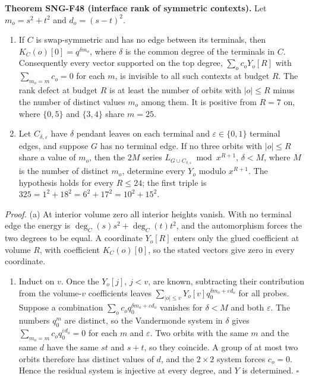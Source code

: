 \documentclass[
  11pt,
  a4paper,
]{report}
\providecommand{\tightlist}{%
  \setlength{\itemsep}{0pt}\setlength{\parskip}{0pt}}
\begin{document}
\textbf{Theorem SNG-F48 (interface rank of symmetric contexts).} Let
\(m_o=s^2+t^2\) and \(d_o=(s-t)^2\).

\begin{enumerate}
\def\labelenumi{(\alph{enumi})}
\item
  If \(C\) is swap-symmetric and has no edge between its terminals, then
  \(K_C(o)[0]=q^{\delta m_o}\), where \(\delta\) is the common degree of
  the terminals in \(C\). Consequently every vector supported on the top
  degree, \(\sum_oc_oY_o[R]\) with \(\sum_{m_o=m}c_o=0\) for each \(m\),
  is invisible to all such contexts at budget \(R\). The rank defect at
  budget \(R\) is at least the number of orbits with \(|o|\le R\) minus
  the number of distinct values \(m_o\) among them. It is positive from
  \(R=7\) on, where \(\{0,5\}\) and \(\{3,4\}\) share \(m=25\).
\item
  Let \(C_{\delta,\varepsilon}\) have \(\delta\) pendant leaves on each
  terminal and \(\varepsilon\in\{0,1\}\) terminal edges, and suppose
  \(G\) has no terminal edge. If no three orbits with \(|o|\le R\) share
  a value of \(m_o\), then the \(2M\) series
  \(L_{G\cup C_{\delta,\varepsilon}}\bmod x^{R+1}\), \(\delta<M\), where
  \(M\) is the number of distinct \(m_o\), determine every \(Y_o\)
  modulo \(x^{R+1}\). The hypothesis holds for every \(R\le24\); the
  first triple is \(325=1^2+18^2=6^2+17^2=10^2+15^2\).
\end{enumerate}

\emph{Proof.} (a) At interior volume zero all interior heights vanish.
With no terminal edge the energy is \(\deg_C(s)s^2+\deg_C(t)t^2\), and
the automorphism forces the two degrees to be equal. A coordinate
\(Y_o[R]\) enters only the glued coefficient at volume \(R\), with
coefficient \(K_C(o)[0]\), so the stated vectors give zero in every
coordinate.

\begin{enumerate}
\def\labelenumi{(\alph{enumi})}
\setcounter{enumi}{1}
\tightlist
\item
  Induct on \(v\). Once the \(Y_o[j]\), \(j<v\), are known, subtracting
  their contribution from the volume-\(v\) coefficients leaves
  \(\sum_{|o|\le v}Y_o[v]q_0^{\delta m_o+\varepsilon d_o}\) for all
  probes. Suppose a combination
  \(\sum_oc_oq_0^{\delta m_o+\varepsilon d_o}\) vanishes for
  \(\delta<M\) and both \(\varepsilon\). The numbers \(q_0^{m}\) are
  distinct, so the Vandermonde system in \(\delta\) gives
  \(\sum_{m_o=m}c_oq_0^{\varepsilon d_o}=0\) for each \(m\) and
  \(\varepsilon\). Two orbits with the same \(m\) and the same \(d\)
  have the same \(st\) and \(s+t\), so they coincide. A group of at most
  two orbits therefore has distinct values of \(d\), and the
  \(2\times2\) system forces \(c_o=0\). Hence the residual system is
  injective at every degree, and \(Y\) is determined. \(\square\)
\end{enumerate}
\end{document}
